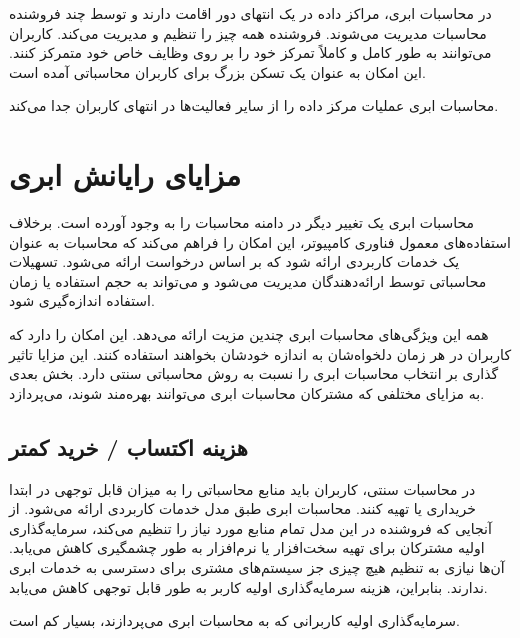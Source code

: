 \documentclass{book}
\begin{document}
            در محاسبات ابری، مراکز داده در یک انتهای دور اقامت دارند و توسط چند فروشنده محاسبات مدیریت می‌شوند. فروشنده همه چیز را تنظیم و مدیریت می‌کند. کاربران می‌توانند به طور کامل و کاملاً تمرکز خود را بر روی وظایف خاص خود متمرکز کنند. این امکان به عنوان یک تسکن بزرگ برای کاربران محاسباتی آمده است.

            \begin{addinfo}
                
                محاسبات ابری عملیات مرکز داده را از سایر فعالیت‌ها در انتهای کاربران جدا می‌کند.

            \end{addinfo}

        \section{مزایای رایانش ابری}

            محاسبات ابری یک تغییر دیگر در دامنه محاسبات را به وجود آورده است. برخلاف استفاده‌های معمول فناوری کامپیوتر، این امکان را فراهم می‌کند که محاسبات به عنوان یک خدمات کاربردی ارائه شود که بر اساس درخواست ارائه می‌شود. تسهیلات محاسباتی توسط ارائه‌دهندگان مدیریت می‌شود و می‌تواند به حجم استفاده یا زمان استفاده اندازه‌گیری شود.

            همه این ویژگی‌های محاسبات ابری چندین مزیت ارائه می‌دهد. این امکان را دارد که کاربران در هر زمان دلخواه‌شان به اندازه‌ خودشان بخواهند استفاده کنند. این مزایا تاثیر گذاری بر انتخاب محاسبات ابری را نسبت به روش محاسباتی سنتی دارد. بخش بعدی به مزایای مختلفی که مشترکان محاسبات ابری می‌توانند بهره‌مند شوند، می‌پردازد.

            \subsection{هزینه اکتساب / خرید کمتر}

                در محاسبات سنتی، کاربران باید منابع محاسباتی را به میزان قابل توجهی در ابتدا خریداری یا تهیه کنند. محاسبات ابری طبق مدل خدمات کاربردی ارائه می‌شود. از آنجایی که فروشنده در این مدل تمام منابع مورد نیاز را تنظیم می‌کند، سرمایه‌گذاری اولیه مشترکان برای تهیه سخت‌افزار یا نرم‌افزار به طور چشمگیری کاهش می‌یابد. آن‌ها نیازی به تنظیم هیچ چیزی جز سیستم‌های مشتری برای دسترسی به خدمات ابری ندارند. بنابراین، هزینه سرمایه‌گذاری اولیه کاربر به طور قابل توجهی کاهش می‌یابد.

                \begin{addinfo}
                    
                    سرمایه‌گذاری اولیه کاربرانی که به محاسبات ابری می‌پردازند، بسیار کم است.

                \end{addinfo}
\end{document}

